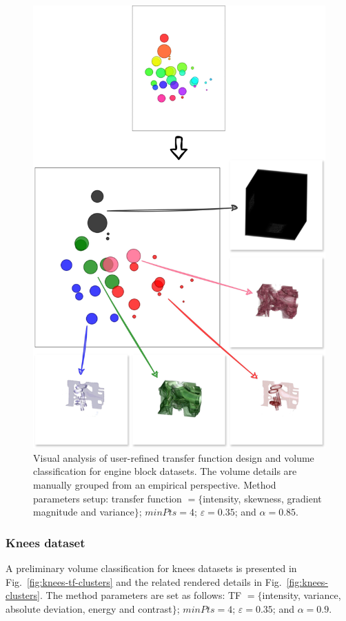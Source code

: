 \begin{figure}[htb!]
    \centering
    \includegraphics[width=\columnwidth]{figs/engine-block-groups.jpg}
    \caption{Visual analysis of user-refined transfer function design and volume classification for engine block datasets. The volume details are manually grouped from an empirical perspective. Method parameters setup: transfer function $=\{$intensity, skewness, gradient magnitude and variance$\}$; $minPts = 4$; $\varepsilon = 0.35$; and $\alpha = 0.85$.}
    \label{fig:engine-block-groups}
\end{figure}



\subsubsection{Knees dataset}
\label{subsubsect:knees-dataset}
A preliminary volume classification for knees datasets is presented in Fig.~\ref{fig:knees-tf-clusters} and the related rendered details in Fig.~\ref{fig:knees-clusters}. The method parameters are set as follows:  TF $=\{$intensity,  variance, absolute deviation, energy and contrast$\}$; $minPts = 4$; $\varepsilon = 0.35$; and $\alpha = 0.9$. 


